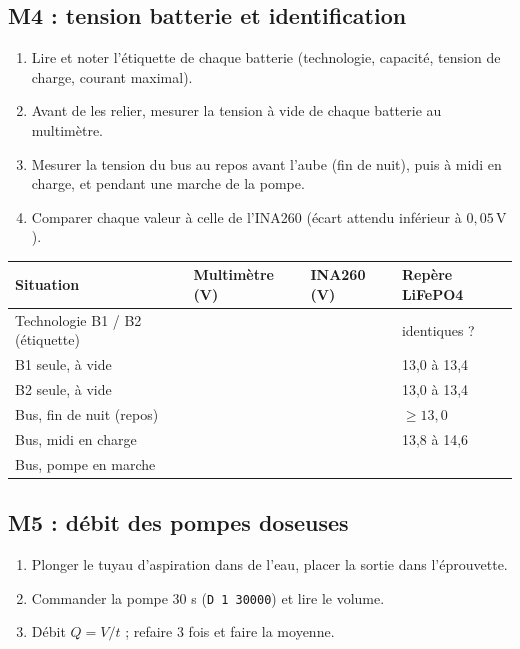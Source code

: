 \documentclass[11pt,a4paper]{article}
\newcommand{\U}[1]{\,\mathrm{#1}}
\begin{document}
\subsection{M4 : tension batterie et identification}
\begin{enumerate}[nosep]
\item Lire et noter l'étiquette de chaque batterie (technologie, capacité, tension de charge, courant maximal).
\item Avant de les relier, mesurer la tension à vide de chaque batterie au multimètre.
\item Mesurer la tension du bus au repos avant l'aube (fin de nuit), puis à midi en charge, et pendant une marche de la pompe.
\item Comparer chaque valeur à celle de l'INA260 (écart attendu inférieur à $0{,}05\U{V}$).
\end{enumerate}

\begin{center}
\begin{tabular}{|p{5.2cm}|p{2.6cm}|p{2.6cm}|p{3.6cm}|}
\hline
\textbf{Situation} & \textbf{Multimètre (V)} & \textbf{INA260 (V)} & \textbf{Repère LiFePO4} \\
\hline
Technologie B1 / B2 (étiquette) & \multicolumn{2}{l|}{} & identiques ? \\[6pt]\hline
B1 seule, à vide & & & 13,0 à 13,4 \\[6pt]\hline
B2 seule, à vide & & & 13,0 à 13,4 \\[6pt]\hline
Bus, fin de nuit (repos) & & & $\ge 13{,}0$ \\[6pt]\hline
Bus, midi en charge & & & 13,8 à 14,6 \\[6pt]\hline
Bus, pompe en marche & & & \\[6pt]\hline
\end{tabular}
\end{center}

\subsection{M5 : débit des pompes doseuses}
\begin{enumerate}[nosep]
\item Plonger le tuyau d'aspiration dans de l'eau, placer la sortie dans l'éprouvette.
\item Commander la pompe 30 s (\texttt{D 1 30000}) et lire le volume.
\item Débit $Q = V / t$ ; refaire 3 fois et faire la moyenne.
\end{enumerate}
\end{document}
